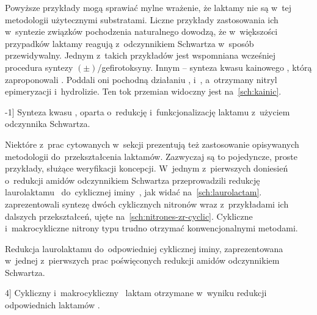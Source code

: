 Powyższe przykłady mogą sprawiać mylne wrażenie, że laktamy nie są w~tej metodologii
  użytecznymi substratami.
Liczne przykłady zastosowania ich w~syntezie związków pochodzenia naturalnego dowodzą,
  że w~większości przypadków laktamy reagują z~odczynnikiem Schwartza w~sposób przewidywalny.
Jednym z~takich przykładów jest wspomniana wcześniej procedura syntezy
  $(\pm)$\-/gefirotoksyny.
Innym \--- synteza kwasu kainowego , którą zaproponowali
  \citeauthor{xia01}.
Poddali oni pochodną   działaniu \schwartz{},
  i~, a~otrzymany nitryl  epimeryzacji i~hydrolizie.
Ten tok przemian widoczny jest na~\cref{sch:kainic}.
\begin{scheme*}
  
  \caption[][-1\baselineskip]{
    Synteza kwasu  , oparta o~redukcję
    i~funkcjonalizację laktamu  z~użyciem odczynnika Schwartza.
  }
  \label{sch:kainic}
\end{scheme*}

Niektóre z~prac cytowanych w~sekcji \textit{} prezentują też
  zastosowanie opisywanych metodologii do~przekształcenia laktamów.
Zazwyczaj są to pojedyncze, proste przykłady, służące weryfikacji koncepcji.
W~jednym z~pierwszych doniesień o~redukcji amidów odczynnikiem Schwartza \citeauthor{schedler93}
  przeprowadzili redukcję laurolaktamu~ do~cyklicznej
  iminy~, jak widać na~\cref{sch:laurolactam}.
\citeauthor{katahara17} zaprezentowali syntezę dwóch cyklicznych nitronów wraz z~przykładami ich
  dalszych przekształceń, ujęte na~\cref{sch:nitrones-zr-cyclic}.
Cykliczne i~makrocykliczne nitrony typu  trudno
  otrzymać konwencjonalnymi metodami.
\begin{marginscheme}[-25\baselineskip]
  
  \caption{
    Redukcja laurolaktamu do~odpowiedniej cyklicznej iminy, zaprezentowana w~jednej z~pierwszych
      prac poświęconych redukcji amidów odczynnikiem Schwartza.
    }
    \label{sch:laurolactam}
\end{marginscheme}
\begin{scheme*}
  
  \caption[][4\baselineskip]{
    Cykliczny  i~makrocykliczny~ laktam
      otrzymane w~wyniku redukcji odpowiednich laktamów .
  }
  \label{sch:nitrones-zr-cyclic}
\end{scheme*}


